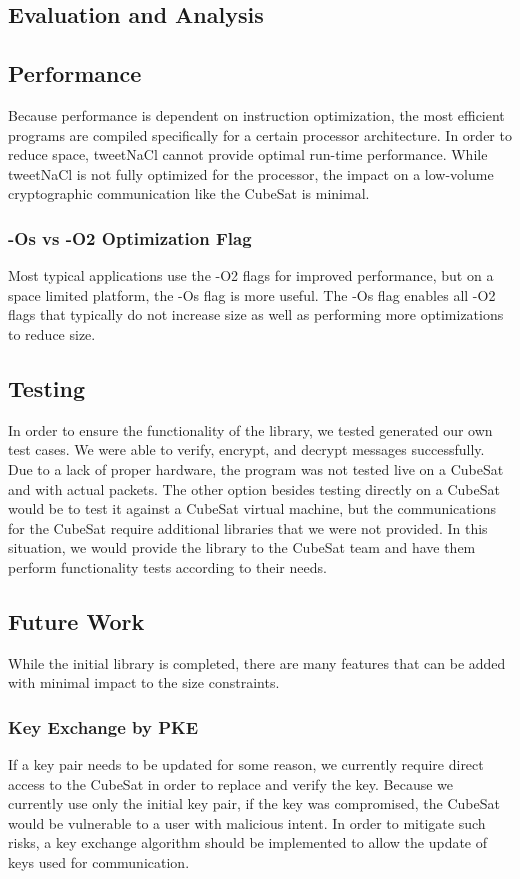 \documentclass[12pt]{article}
\begin{document}
\begin{multicols}{2}
\section{Evaluation and Analysis}
\subsection{Performance}
Because performance is dependent on instruction optimization, the most efficient programs are compiled specifically for a certain processor architecture. In order to reduce space, tweetNaCl cannot provide optimal run-time performance. \cite{TweetNaClPaper} While tweetNaCl is not fully optimized for the processor, the impact on a low-volume cryptographic communication like the CubeSat is minimal.
\subsubsection{-Os vs -O2 Optimization Flag}
Most typical applications use the -O2 flags for improved performance, but on a space limited platform, the -Os flag is more useful. The -Os flag enables all -O2 flags that typically do not increase size as well as performing more optimizations to reduce size. \cite{GCCOP} 
\subsection{Testing}
In order to ensure the functionality of the library, we tested generated our own test cases. We were able to verify, encrypt, and decrypt messages successfully. Due to a lack of proper hardware, the program was not tested live on a CubeSat and with actual packets. The other option besides testing directly on a CubeSat would be to test it against a CubeSat virtual machine, but the communications for the CubeSat require additional libraries that we were not provided. In this situation, we would provide the library to the CubeSat team and have them perform functionality tests according to their needs.
\subsection{Future Work}
While the initial library is completed, there are many features that can be added with minimal impact to the size constraints.
\subsubsection{Key Exchange by PKE}
If a key pair needs to be updated for some reason, we currently require direct access to the CubeSat in order to replace and verify the key. Because we currently use only the initial key pair, if the key was compromised, the CubeSat would be vulnerable to a user with malicious intent. In order to mitigate such risks, a key exchange algorithm should be implemented to allow the update of keys used for communication.

\end{multicols}
\end{document}
